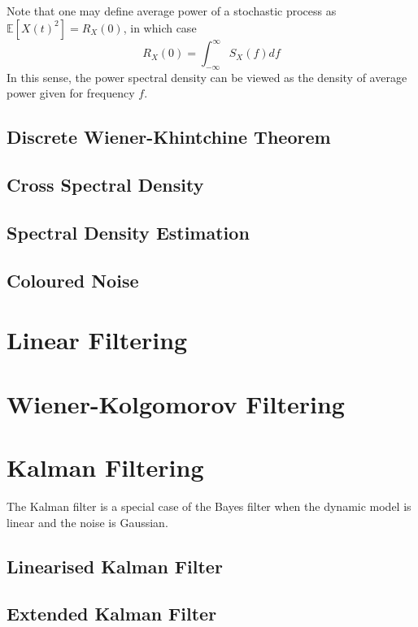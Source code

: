 \documentclass[11pt]{report} %
\begin{document}
Note that one may define average power of a stochastic process as $\mathbb{E}\left[X\left(t\right)^{2}\right] = R_{X}\left(0\right)$, in which case
\begin{equation}
R_{X}\left(0\right) = \int_{-\infty}^{\infty}S_{X}\left(f\right)df
\end{equation}
In this sense, the power spectral density can be viewed as the density of average power given for frequency $f$.

\subsection{Discrete Wiener-Khintchine Theorem}

\subsection{Cross Spectral Density}

\subsection{Spectral Density Estimation}

\subsection{Coloured Noise}

\section{Linear Filtering}

\section{Wiener-Kolgomorov Filtering}

\section{Kalman Filtering}

The Kalman filter is a special case of the Bayes filter when the dynamic model is linear and the noise is Gaussian.

\subsection{Linearised Kalman Filter}

\subsection{Extended Kalman Filter}
\end{document}
